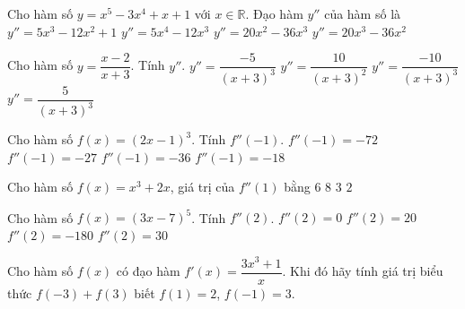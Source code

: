 \begin{ex}%
	Cho hàm số $y=x^5-3x^4+x+1$ với $x\in\mathbb{R}$. Đạo hàm $y''$ của hàm  số là
	\choice 
		 {$y''=5x^3-12x^2+1$}
		 {$y''=5x^4-12x^3$}
		 {$y''=20x^2-36x^3$}
		{\True  $y''=20x^3-36x^2$}
\end{ex}

\begin{ex}%
	Cho hàm số $y=\dfrac{x-2}{x+3}$.  Tính $y''$.
	 \choice
		 {$y''=\dfrac{-5}{(x+3)^3}$}
		{$y''=\dfrac{10}{(x+3)^2}$} 
		{\True  $y''=\dfrac{-10}{(x+3)^3}$}
		{$y''=\dfrac{5}{(x+3)^3}$} 
\end{ex}

\begin{ex}%
	Cho hàm số $f(x)=(2x-1)^{3}$.  Tính $f''(-1)$.
	\choice 
		{\True $f''(-1)=-72$} 
		{$f''(-1)=-27$} 
		 {$f''(-1)=-36$}
		{$f''(-1)=-18$} 
\end{ex}

\begin{ex}%
	Cho hàm số $f(x)=x^3+2x$,  giá trị của $f''(1)$ bằng
	\choice 
		{\True $6$} 
		 {$8$}
		{$3$} 
		{$2$} 
\end{ex}

\begin{ex}%
	Cho hàm số  $f(x)=(3x-7)^5$. Tính $f''(2)$.
	 \choice
		 {$f''(2)=0$}
		 {$f''(2)=20$}
		{\True  $f''(2)=-180$}
		{$f''(2)=30$} 
\end{ex}

\begin{bt}%
	Cho hàm số $f(x)$ có đạo hàm $f'(x)=\dfrac{3x^3+1}{x}$. Khi  đó hãy tính giá trị biểu thức $f(-3)+f(3)$ biết $f(1)=2$, $f(-1)=3$.
\end{bt}
